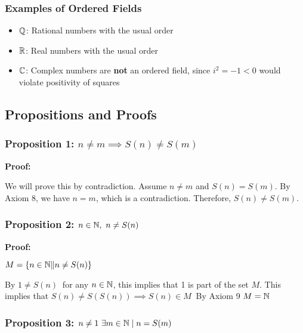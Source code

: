 \subsubsection{Examples of Ordered Fields}

\begin{itemize}

	\item \( \mathbb{Q} \): Rational numbers with the usual order

	\item \( \mathbb{R} \): Real numbers with the usual order

	\item \( \mathbb{C} \): Complex numbers are \textbf{not} an ordered field, since \( i^2 = -1 < 0 \) 
	      would violate positivity of squares

\end{itemize}

\subsection{Propositions and Proofs}

\subsubsection{Proposition 1: \texorpdfstring{\(n \ne m \implies S(n) \ne S(m)\)}{n!= m implies S (n)!=S (m)}}

\textbf{Proof:} 

We will prove this by contradiction. Assume \( n \ne m \) and \( S(n) = S(m) \). 
By Axiom 8, we have \( n = m \), which is a contradiction. Therefore, \( S(n) \ne S(m) \).

\subsubsection{Proposition 2: \texorpdfstring{ \(n \in \mathbb{N},\ n \ne S(n)\)}{ For any n in N, n!= S (n)}}

\textbf{Proof:} 

\(M = \{n \in \Naturals \| n \ne S(n) \}\ \)

By \(1 \ne S(n)\ \) for any \(n \in \mathbb{N}\), this implies that 1 is part of the set \(M\). 
This implies that \(S(n) \ne S(S(n)) \implies S(n) \in M\ \) By Axiom 9 \(M = \mathbb{N}\)

\subsubsection{Proposition 3: \texorpdfstring{\(n \ne 1\ \exists m \in \mathbb{N} \mid n = S(m)\)}{n!= 1, exists m in N | n = S (m)}}

